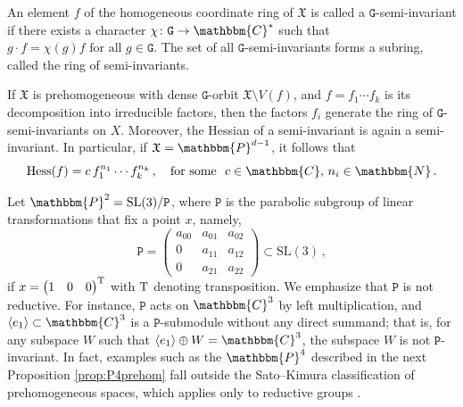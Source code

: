 \documentclass[aps,floatfix,groupedaddress,superscriptaddress,longbibliography,footinbib,notitlepage,showpacs]{revtex4-1}
\def\Hess{{\rm Hess}}
\begin{document}
An element $f$ of the homogeneous coordinate ring of $\mathfrak{X}$ is called a $\mathtt{G}$-semi-invariant if there exists a character 
$\chi \colon \mathtt{G} \to \mathbbm{C}^*$ such that $g \cdot f = \chi(g) f \text{ for all } g \in \mathtt{G}$. The set of all $\mathtt{G}$-semi-invariants forms a subring, called the ring of semi-invariants.  

If $\mathfrak{X}$ is prehomogeneous with dense $\mathtt{G}$-orbit $\mathfrak{X} \setminus V(f)$, and $f = f_1 \cdots f_k$ is its decomposition into irreducible factors, then the factors $f_i$ generate the ring of $\mathtt{G}$-semi-invariants on $X$.  
Moreover, the Hessian of a semi-invariant is again a semi-invariant. In particular, if $\mathfrak{X} = \mathbbm{P}^{d-1}$, it follows that
\begin{equation}
\Hess(f) = c \, f_1^{n_1} \cdots f_k^{n_k}\,, \quad \text{for some}~~c\in\mathbbm{C},\, n_i\in\mathbbm{N}\,.
\end{equation}

Let $\mathbbm{P}^2 = \mathrm{SL}(3)/\mathtt{P}$, where $\mathtt{P}$ is the parabolic subgroup of linear transformations that fix a point $x$, namely,
\begin{equation}\label{eq:parabolicP}
\mathtt{P} = \begin{pmatrix}
a_{00} & a_{01} & a_{02} \\
0 & a_{11} & a_{12} \\
0 & a_{21} & a_{22}
\end{pmatrix} \subset \mathrm{SL}(3)\,,
\end{equation}
if $x=\begin{pmatrix}1&0&0\end{pmatrix}^{\rm T}$ with ${\rm T}$ denoting transposition. We emphasize that $\mathtt{P}$ is not reductive. For instance, $\mathtt{P}$ acts on $\mathbbm{C}^3$ by left multiplication, and $\langle e_1 \rangle \subset \mathbbm{C}^3$ is a $\mathtt{P}$-submodule without any direct summand; that is, for any subspace $W$ such that $\langle e_1 \rangle \oplus W = \mathbbm{C}^3$, the subspace $W$ is not $\mathtt{P}$-invariant. In fact, examples such as the $\mathbbm{P}^4$ described in the next Proposition \ref{prop:P4prehom} fall outside the Sato–Kimura classification of prehomogeneous spaces, which applies only to reductive groups \cite{SK}. 
 
\end{document}
